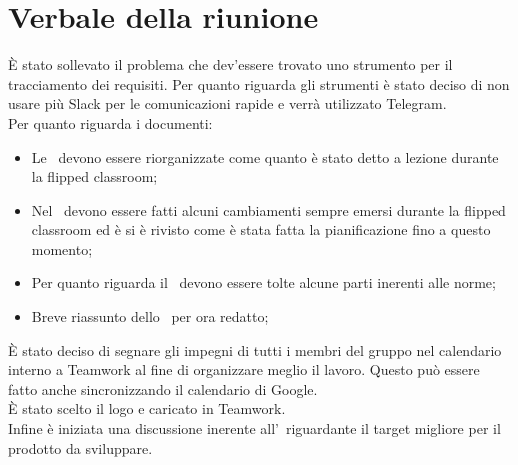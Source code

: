 \documentclass[../Riunione16-01-07.tex]{subfiles}
\begin{document}
\section{Verbale della riunione}
È stato sollevato il problema che dev'essere trovato uno strumento per il tracciamento dei requisiti. Per quanto riguarda gli strumenti è stato deciso di non usare più Slack per le comunicazioni rapide e verrà utilizzato Telegram. \\
Per quanto riguarda i documenti:
\begin{itemize}
	\item Le \normediprogetto\ devono essere riorganizzate come quanto è stato detto a lezione durante la flipped classroom;
	\item Nel \pianodiprogetto\ devono essere fatti alcuni cambiamenti sempre emersi durante la flipped classroom ed è si è rivisto come è stata fatta la pianificazione fino a questo momento;
	\item Per quanto riguarda il \pianodiqualifica\ devono essere tolte alcune parti inerenti alle norme;
	\item Breve riassunto dello \studiodifattibilita\ per ora redatto;
\end{itemize}
È stato deciso di segnare gli impegni di tutti i membri del gruppo nel calendario interno a Teamwork al fine di organizzare meglio il lavoro. Questo può essere fatto anche sincronizzando il calendario di Google.\\
È stato scelto il logo e caricato in Teamwork.\\
Infine è iniziata una discussione inerente all'\analisideirequisiti\ riguardante il target migliore per il prodotto da sviluppare.
\end{document}
